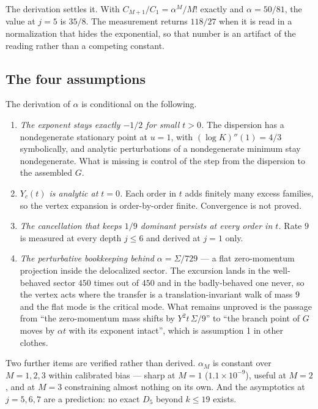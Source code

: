\documentclass[11pt]{article}
\begin{document}
The derivation settles it. With $C_{M+1}/C_1 = \alpha^M/M!$ exactly and
$\alpha = 50/81$, the value at $j = 5$ is $35/8$. The measurement returns
$118/27$ when it is read in a normalization that hides the exponential, so that
number is an artifact of the reading rather than a competing constant.

\subsection{The four assumptions}
\label{sec:assumptions}

The derivation of $\alpha$ is conditional on the following.

\begin{enumerate}
\item \emph{The exponent stays exactly $-1/2$ for small $t > 0$.} The dispersion
  has a nondegenerate stationary point at $u = 1$, with $(\log K)''(1) = 4/3$
  symbolically, and analytic perturbations of a nondegenerate minimum stay
  nondegenerate. What is missing is control of the step from the dispersion to
  the assembled $G$.
\item \emph{$Y_c(t)$ is analytic at $t = 0$.} Each order in $t$ adds finitely
  many excess families, so the vertex expansion is order-by-order finite.
  Convergence is not proved.
\item \emph{The cancellation that keeps $1/9$ dominant persists at every order in
  $t$.} Rate $9$ is measured at every depth $j \le 6$ and derived at $j = 1$
  only.
\item \emph{The perturbative bookkeeping behind $\alpha = \Sigma/729$} --- a flat
  zero-momentum projection inside the delocalized sector. The excursion lands in the well-behaved sector
  $450$ times out of $450$ and in the badly-behaved one never, so the vertex acts
  where the transfer is a translation-invariant walk of mass $9$ and the flat
  mode is the critical mode. What remains unproved is the passage from
  ``the zero-momentum mass shifts by $Y^2t\,\Sigma/9$'' to ``the branch point of
  $G$ moves by $\alpha t$ with its exponent intact'', which is assumption 1 in
  other clothes.
\end{enumerate}

Two further items are verified rather than derived. $\alpha_M$ is constant over
$M = 1,2,3$ within calibrated bias --- sharp at $M=1$ ($1.1\times10^{-9}$),
useful at $M=2$, and at $M=3$ constraining almost nothing on its own. And the
asymptotics at $j = 5,6,7$ are a prediction: no exact $D_5$ beyond $k \le 19$
exists.
\end{document}
